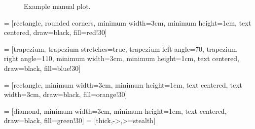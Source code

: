 \begin{figure}[H]
    \center
    \caption{Example manual plot.} 
    \label{fig:manualPlot}
\end{figure}


 = [rectangle, rounded corners, 
minimum width=3cm, 
minimum height=1cm,
text centered, 
draw=black, 
fill=red!30]

 = [trapezium, 
trapezium stretches=true, %
trapezium left angle=70, 
trapezium right angle=110, 
minimum width=3cm, 
minimum height=1cm, text centered, 
draw=black, fill=blue!30]

 = [rectangle, 
minimum width=3cm, 
minimum height=1cm, 
text centered, 
text width=3cm, 
draw=black, 
fill=orange!30]

 = [diamond, 
minimum width=3cm, 
minimum height=1cm, 
text centered, 
draw=black, 
fill=green!30]
 = [thick,->,>=stealth]

